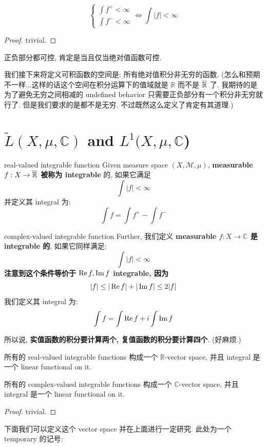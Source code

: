 \documentclass[lang=cn,11pt]{elegantbook}
\begin{document}
\begin{lemma}
    \[
    \begin{cases}
        \int f^+ < \infty \\
        \int f^- < \infty
    \end{cases} \Longleftrightarrow \int|f| < \infty
    \]
\end{lemma}
\begin{proof}
    trivial.
\end{proof}
 正负部分都可控, 肯定是当且仅当绝对值函数可控.

 我们接下来将定义可积函数的空间是: 所有绝对值积分非无穷的函数. (怎么和预期不一样...这样的话这个空间在积分运算下的值域就是 $\mathbb{R}$ 而不是 $\overline{\mathbb{R}}$ 了. 我期待的是为了避免无穷之间相减的 undefined behavior 只需要正负部分有一个积分非无穷就行了. 但是我们要求的是都不是无穷.  不过既然这么定义了肯定有其道理.)




\section{$\tilde{L}(X, \mu, \mathbb{C})$ and $L^1(X, \mu, \mathbb{C}$)}
\begin{definition}{real-valued integrable function}
Given measure space $(X,\mathcal{M},\mu)$,  \textbf{measurable $f : X \rightarrow \overline{\mathbb{R}}$ 被称为 integrable} 的, 如果它满足 \[ \int |f| < \infty\] 并定义其 integral 为: \[\int f = \int f^+ - \int f^-\]
\end{definition}
\begin{definition}{complex-valued integrable function}
    Further, 我们定义 \textbf{measurable $f:X \rightarrow \mathbb{C}$ 是 integrable 的}, 如果它同样满足: \[\int |f| < \infty\]
\textbf{注意到这个条件等价于 \(\operatorname{Re} f, \operatorname{Im} f\) integrable, 因为}
\[|f| \leq |\operatorname{Re} f| + |\operatorname{Im} f| \leq 2|f|\]
我们定义其 integral 为: \[\int f = \int \operatorname{Re} f+ i \int \operatorname{Im} f\]
\end{definition}
\begin{remark}
    所以说,\textbf{ 实值函数的积分要计算两个, 复值函数的积分要计算四个}. (好麻烦.)
\end{remark}


\begin{proposition}
    所有的 real-valued integrable functions 构成一个 $\mathbb{R}$-vector space, 并且 integral 是一个 linear functional on it.
    
    所有的 complex-valued integrable functions 构成一个 $\mathbb{C}$-vector space, 并且 integral 是一个 linear functional on it.
\end{proposition}
\begin{proof}
    trivial.
\end{proof}
下面我们可以定义这个 vector space 并在上面进行一定研究. 此处为一个 temporary 的记号:
    
\end{document}
